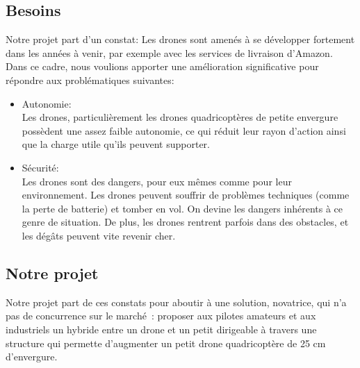 \documentclass[a4paper,11pt]{article}
\begin{document}
\subsection{Besoins}
Notre projet part d'un constat: Les drones sont amenés à se développer fortement dans les années à venir, par exemple avec les services de livraison d'Amazon. Dans ce cadre, nous voulions apporter une amélioration significative pour répondre aux problématiques suivantes:
\begin{itemize}
	\item Autonomie: \\
		Les drones, particulièrement les drones quadricoptères de petite envergure possèdent une assez faible autonomie, ce qui réduit leur rayon d'action ainsi que la charge utile qu'ils peuvent supporter.
	\item Sécurité: \\
		Les drones sont des dangers, pour eux mêmes comme pour leur environnement. Les drones peuvent souffrir de problèmes techniques (comme la perte de batterie) et tomber en vol. On devine les dangers inhérents à ce genre de situation. De plus, les drones rentrent parfois dans des obstacles, et les dégâts peuvent vite revenir cher.
\end{itemize}

\subsection{Notre projet}
Notre projet part de ces constats pour aboutir à une solution, novatrice, qui n'a pas de concurrence sur le marché~: proposer aux pilotes amateurs et aux industriels un hybride entre un drone et un petit dirigeable à travers une structure qui permette d'augmenter un petit drone quadricoptère de 25 cm d'envergure.
\end{document}
